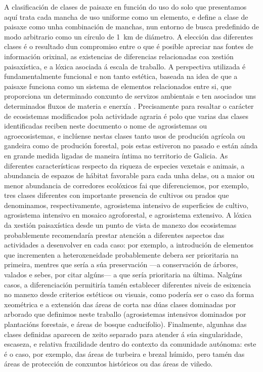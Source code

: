 \documentclass[11pt,a4paper]{article}
\begin{document}
A clasificación de clases de paisaxe en función do uso do solo que presentamos aquí trata cada mancha de uso uniforme como un elemento, e define a clase de paisaxe como unha combinación de manchas, nun entorno de busca predefinido de modo arbitrario como un círculo de 1~km de diámetro. A elección das diferentes clases é o resultado dun compromiso entre o que é posible apreciar nas fontes de información orixinal, as existencias de diferencias relacionadas coa xestión paisaxística, e a lóxica asociada á escala de traballo. A perspectiva utilizada é fundamentalmente funcional e non tanto estética, baseada na idea de que a paisaxe funciona como un sistema de elementos relacionados entre si, que proporciona un determinado conxunto de servizos ambientais e ten asociados uns determinados fluxos de materia e enerxía \citep{Forman1986}. Precisamente para resaltar o carácter de ecosistemas modificados pola actividade agraria é polo que varias das clases identificadas reciben neste documento o nome de agrosistemas ou agroecosistemas, e inclúense nestas clases tanto usos de produción agrícola ou gandeira como de produción forestal, pois estas estiveron no pasado e están aínda en grande medida ligadas de maneira íntima no territorio de Galicia. As diferentes características respecto da riqueza de especies vexetais e animais, a abundancia de espazos de hábitat favorable para cada unha delas, ou a maior ou menor abundancia de corredores ecolóxicos fai que diferenciemos, por exemplo, tres clases diferentes con importante presencia de cultivos ou prados que denominamos, respectivamente, agrosistema intensivo de superficies de cultivo, agrosistema intensivo en mosaico agroforestal, e agrosistema extensivo. A lóxica da xestión paisaxística desde un punto de vista de manexo dos ecosistemas probablemente recomendaría prestar atención a diferentes aspectos das actividades a desenvolver en cada caso: por exemplo, a introdución de elementos que incrementen a heteroxeneidade probablemente debera ser prioritaria na primeira, mentres que sería a súa preservación ---a conservación de árbores, valados e sebes, por citar algúns--- a que sería prioritaria na última. Nalgúns casos, a diferenciación permitiría tamén establecer diferentes niveis de esixencia no manexo desde criterios estéticos ou visuais, como podería ser o caso da forma xeométrica e a extensión das áreas de corta nas dúas clases dominadas por arborado que definimos neste traballo (agrosistemas intensivos dominados por plantacións forestais, e áreas de bosque caducifolio). Finalmente, algunhas das clases definidas aparecen de xeito separado para atender á súa singularidade, escaseza, e relativa fraxilidade dentro do contexto da comunidade autónoma: este é o caso, por exemplo, das áreas de turbeira e brezal húmido, pero tamén das áreas de protección de conxuntos históricos ou das áreas de viñedo. 
\end{document}
